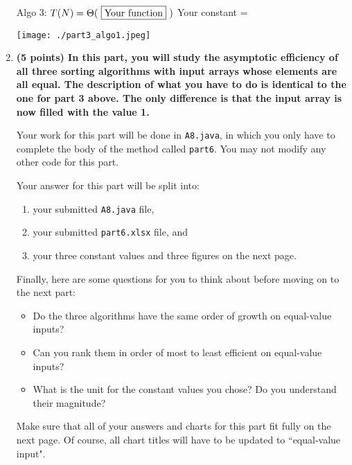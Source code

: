 \documentclass[12pt]{article}
\begin{document}
\begin{enumerate}
{   %

    Algo 3: $T(N) =\Theta(\ \fbox{\color{black}{Your function}}\ )$
    \hfill Your constant =  \fbox{\color{black}{Your value}}

   \centerline{\texttt{[image: ./part3\_algo1.jpeg]}}

   \newpage
}

   \item                            %
   {\bf \color{red} (5 points) In this part, you will study the asymptotic
   efficiency of all three sorting algorithms with input arrays whose elements
   are all equal. The description of what you have to do is identical to the one
   for part 3 above. The only difference is that the input array is now filled
   with the value 1.

  Your work for this part will be done in {\tt A8.java}, in which you only
  have to complete the body of the method called {\tt part6}. You may not
  modify any other code for this part.

 Your answer for this part will be split into:
 \begin{enumerate}
 \item your submitted {\tt A8.java} file,
 \item your submitted {\tt part6.xlsx} file, and
 \item your three constant values and three figures on the next page.
 \end{enumerate}

 Finally, here are some questions for you to think about before moving on to the
 next part:

 \begin{itemize}
     \item Do the three algorithms have the same order of growth on
     equal-value inputs?
     \item Can you rank them in order of most to least efficient on
     equal-value inputs?
     \item What is the unit for the constant values you chose? Do you understand
     their magnitude?
   \end{itemize}

   Make sure that all of your answers and charts for this part fit fully on the
   next page. Of course, all chart titles will have to be updated to
  ``equal-value input".

}
\end{enumerate}
\end{document}
